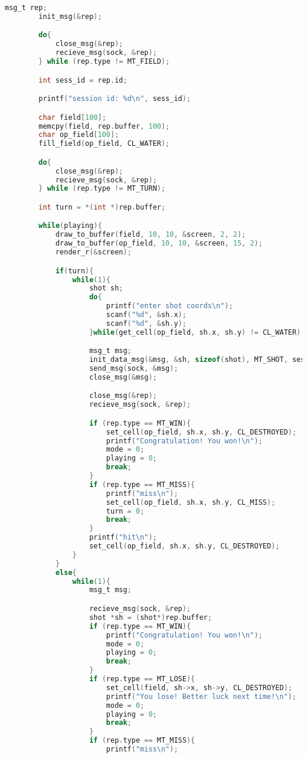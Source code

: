 \documentclass[12pt]{article}
\begin{document}
\begin{lstlisting}[language=C, basicstyle=\scriptsize]
        msg_t rep;
        init_msg(&rep);

        do{
            close_msg(&rep);
            recieve_msg(sock, &rep);
        } while (rep.type != MT_FIELD);

        int sess_id = rep.id;

        printf("session id: %d\n", sess_id);

        char field[100];
        memcpy(field, rep.buffer, 100);
        char op_field[100];
        fill_field(op_field, CL_WATER);

        do{
            close_msg(&rep);
            recieve_msg(sock, &rep);
        } while (rep.type != MT_TURN);

        int turn = *(int *)rep.buffer;

        while(playing){
            draw_to_buffer(field, 10, 10, &screen, 2, 2);
            draw_to_buffer(op_field, 10, 10, &screen, 15, 2);
            render_r(&screen);

            if(turn){
                while(1){
                    shot sh;
                    do{
                        printf("enter shot coords\n");
                        scanf("%d", &sh.x);
                        scanf("%d", &sh.y);
                    }while(get_cell(op_field, sh.x, sh.y) != CL_WATER);

                    msg_t msg;
                    init_data_msg(&msg, &sh, sizeof(shot), MT_SHOT, sess_id);
                    send_msg(sock, &msg);
                    close_msg(&msg);

                    close_msg(&rep);
                    recieve_msg(sock, &rep);

                    if (rep.type == MT_WIN){
                        set_cell(op_field, sh.x, sh.y, CL_DESTROYED);
                        printf("Congratulation! You won!\n");
                        mode = 0;
                        playing = 0;
                        break;
                    }
                    if (rep.type == MT_MISS){
                        printf("miss\n");
                        set_cell(op_field, sh.x, sh.y, CL_MISS);
                        turn = 0;
                        break;
                    }
                    printf("hit\n");
                    set_cell(op_field, sh.x, sh.y, CL_DESTROYED);
                }
            }
            else{
                while(1){
                    msg_t msg;

                    recieve_msg(sock, &rep);
                    shot *sh = (shot*)rep.buffer;
                    if (rep.type == MT_WIN){
                        printf("Congratulation! You won!\n");
                        mode = 0;
                        playing = 0;
                        break;
                    }
                    if (rep.type == MT_LOSE){
                        set_cell(field, sh->x, sh->y, CL_DESTROYED);
                        printf("You lose! Better luck next time!\n");
                        mode = 0;
                        playing = 0;
                        break;
                    }
                    if (rep.type == MT_MISS){
                        printf("miss\n");


\end{lstlisting}
\end{document}
